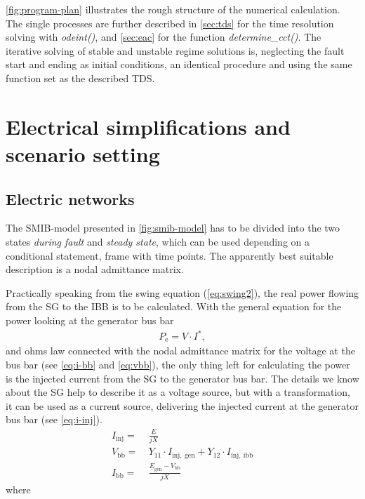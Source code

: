 \autoref{fig:program-plan} illustrates the rough structure of the numerical calculation. The single processes are further described in \autoref{sec:tds} for the time resolution solving with {\itshape odeint()}, and \autoref{sec:eac} for the function {\itshape determine\_cct()}. 
The iterative solving of stable and unstable regime solutions is, neglecting the fault start and ending as initial conditions, an identical procedure and using the same function set as the described \acs{TDS}.

\section{Electrical simplifications and scenario setting}
\label{sec:scenario}

\subsection{Electric networks}
\label{sec:el-networks}

The \acs{SMIB}-model presented in \autoref{fig:smib-model} has to be divided into the two states {\itshape during fault} and {\itshape steady state}, which can be used depending on a conditional statement, frame with time points. The apparently best suitable description is a nodal admittance matrix.

Practically speaking from the swing equation (\autoref{eq:swing2}), the real power flowing from the \acs{SG} to the \acs{IBB} is to be calculated. With the general equation for the power looking at the generator bus bar
\begin{align}
        P_\mathrm{e}=V \cdot I^* \nonumber,
\end{align}
and ohms law connected with the nodal admittance matrix for the voltage at the bus bar (see \autoref{eq:i-bb} and \ref{eq:vbb}), the only thing left for calculating the power is the injected current from the \acs{SG} to the generator bus bar. The details we know about the \acs{SG} help to describe it as a voltage source, but with a transformation, it can be used as a current source, delivering the injected current at the generator bus bar (see \autoref{eq:i-inj}).
\begin{align}
        I_\mathrm{inj}=&~\frac{\underline{E}}{jX} \label{eq:i-inj} \\[6pt]
        V_\mathrm{bb}=&~Y_\mathrm{11} \cdot I_\mathrm{inj,~gen} + Y_\mathrm{12} \cdot I_\mathrm{inj,~ibb} \label{eq:vbb} \\[6pt]
        I_\mathrm{bb}=&~\frac{\underline{E}_\mathrm{gen}-V_\mathrm{bb}}{jX} \label{eq:i-bb}
\end{align}
where

